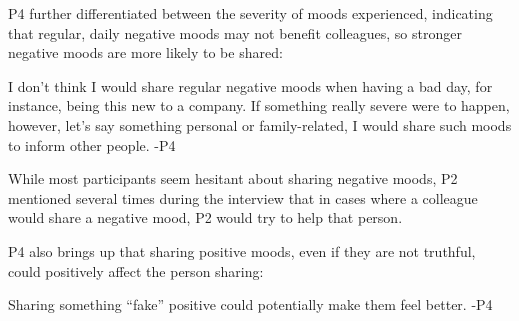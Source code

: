 

P4 further differentiated between the severity of moods experienced, indicating that regular, daily negative moods may not benefit colleagues, so stronger negative moods are more likely to be shared:

\begin{displayquote}
    I don't think I would share regular negative moods when having a bad day, for instance, being this new to a company. If something really severe were to happen, however, let's say something personal or family-related, I would share such moods to inform other people. -P4
\end{displayquote}

While most participants seem hesitant about sharing negative moods, P2 mentioned several times during the interview that in cases where a colleague would share a negative mood, P2 would try to help that person.

P4 also brings up that sharing positive moods, even if they are not truthful, could positively affect the person sharing:

\begin{displayquote}
    Sharing something \enquote{fake} positive could potentially make them feel better. -P4
\end{displayquote}




